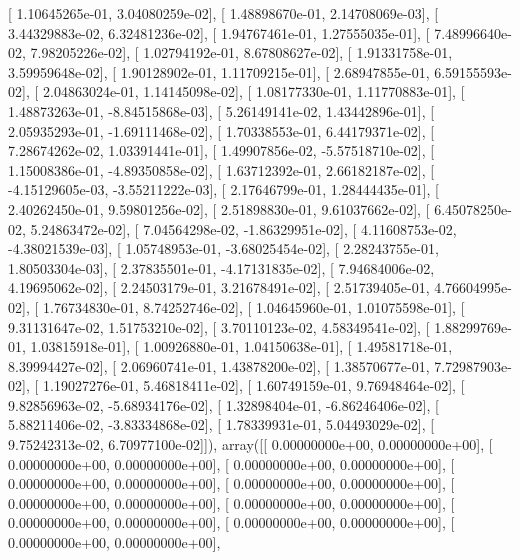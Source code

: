 \documentclass{article}
\begin{document}
       [  1.10645265e-01,   3.04080259e-02],
       [  1.48898670e-01,   2.14708069e-03],
       [  3.44329883e-02,   6.32481236e-02],
       [  1.94767461e-01,   1.27555035e-01],
       [  7.48996640e-02,   7.98205226e-02],
       [  1.02794192e-01,   8.67808627e-02],
       [  1.91331758e-01,   3.59959648e-02],
       [  1.90128902e-01,   1.11709215e-01],
       [  2.68947855e-01,   6.59155593e-02],
       [  2.04863024e-01,   1.14145098e-02],
       [  1.08177330e-01,   1.11770883e-01],
       [  1.48873263e-01,  -8.84515868e-03],
       [  5.26149141e-02,   1.43442896e-01],
       [  2.05935293e-01,  -1.69111468e-02],
       [  1.70338553e-01,   6.44179371e-02],
       [  7.28674262e-02,   1.03391441e-01],
       [  1.49907856e-02,  -5.57518710e-02],
       [  1.15008386e-01,  -4.89350858e-02],
       [  1.63712392e-01,   2.66182187e-02],
       [ -4.15129605e-03,  -3.55211222e-03],
       [  2.17646799e-01,   1.28444435e-01],
       [  2.40262450e-01,   9.59801256e-02],
       [  2.51898830e-01,   9.61037662e-02],
       [  6.45078250e-02,   5.24863472e-02],
       [  7.04564298e-02,  -1.86329951e-02],
       [  4.11608753e-02,  -4.38021539e-03],
       [  1.05748953e-01,  -3.68025454e-02],
       [  2.28243755e-01,   1.80503304e-03],
       [  2.37835501e-01,  -4.17131835e-02],
       [  7.94684006e-02,   4.19695062e-02],
       [  2.24503179e-01,   3.21678491e-02],
       [  2.51739405e-01,   4.76604995e-02],
       [  1.76734830e-01,   8.74252746e-02],
       [  1.04645960e-01,   1.01075598e-01],
       [  9.31131647e-02,   1.51753210e-02],
       [  3.70110123e-02,   4.58349541e-02],
       [  1.88299769e-01,   1.03815918e-01],
       [  1.00926880e-01,   1.04150638e-01],
       [  1.49581718e-01,   8.39994427e-02],
       [  2.06960741e-01,   1.43878200e-02],
       [  1.38570677e-01,   7.72987903e-02],
       [  1.19027276e-01,   5.46818411e-02],
       [  1.60749159e-01,   9.76948464e-02],
       [  9.82856963e-02,  -5.68934176e-02],
       [  1.32898404e-01,  -6.86246406e-02],
       [  5.88211406e-02,  -3.83334868e-02],
       [  1.78339931e-01,   5.04493029e-02],
       [  9.75242313e-02,   6.70977100e-02]]), array([[  0.00000000e+00,   0.00000000e+00],
       [  0.00000000e+00,   0.00000000e+00],
       [  0.00000000e+00,   0.00000000e+00],
       [  0.00000000e+00,   0.00000000e+00],
       [  0.00000000e+00,   0.00000000e+00],
       [  0.00000000e+00,   0.00000000e+00],
       [  0.00000000e+00,   0.00000000e+00],
       [  0.00000000e+00,   0.00000000e+00],
       [  0.00000000e+00,   0.00000000e+00],
       [  0.00000000e+00,   0.00000000e+00],
\end{document}
